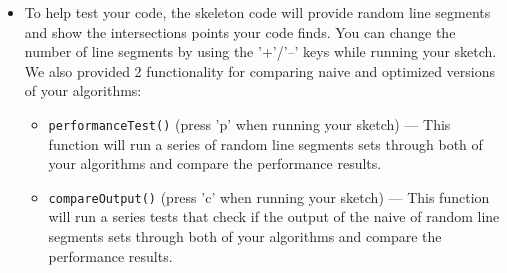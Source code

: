 \documentclass[a4paper,12pt]{article}
\begin{document}
\begin{itemize}
\newpage

\item To help test your code, the skeleton code will provide random line segments and show the intersections points your code finds. You can change the number of line segments by using the '+'/'--' keys while running your sketch. We also provided 2 functionality for comparing naive and optimized versions of your algorithms:


\begin{itemize}

   \item \texttt{performanceTest()} (press 'p' when running your sketch) --- This function will run a series of random line segments sets through both of your algorithms and compare the performance results.

   \item \texttt{compareOutput()} (press 'c' when running your sketch) --- This function will run a series tests that check if the output of the naive of random line segments sets through both of your algorithms and compare the performance results.

   
\end{itemize}
\end{itemize}

\projectSubmission
\end{document}
